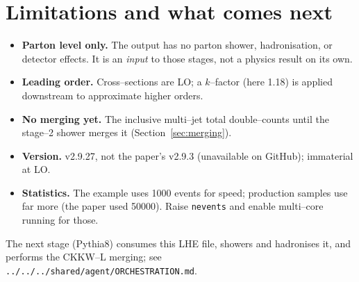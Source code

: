 \documentclass[11pt,oneside]{report}
\newcommand{\code}[1]{\texttt{#1}}
\begin{document}
\chapter{Limitations and what comes next}
\label{ch:limits}

\begin{itemize}[nosep]
  \item \textbf{Parton level only.} The output has no parton shower, hadronisation, or detector
        effects. It is an \emph{input} to those stages, not a physics result on its own.
  \item \textbf{Leading order.} Cross--sections are LO; a $k$--factor (here 1.18) is applied
        downstream to approximate higher orders.
  \item \textbf{No merging yet.} The inclusive multi--jet total double--counts until the stage--2
        shower merges it (Section~\ref{sec:merging}).
  \item \textbf{Version.} v2.9.27, not the paper's v2.9.3 (unavailable on GitHub); immaterial at LO.
  \item \textbf{Statistics.} The example uses 1000 events for speed; production samples use far more
        (the paper used 50000). Raise \code{nevents} and enable multi--core running for those.
\end{itemize}
The next stage (Pythia8) consumes this LHE file, showers and hadronises it, and performs the CKKW--L
merging; see \code{../../../shared/agent/ORCHESTRATION.md}.

\appendix
\end{document}
